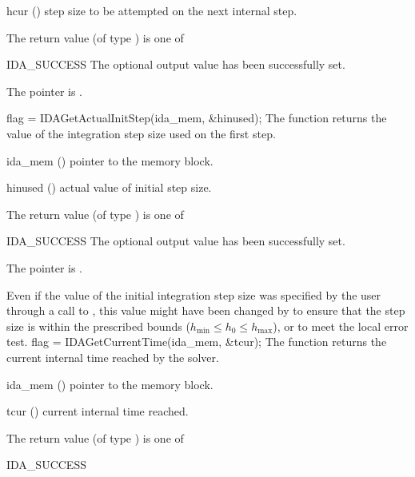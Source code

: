 {{\begin{args}
  \item[hcur] ()
    step size to be attempted on the next internal step.
  \end{args}
}
{
  The return value  (of type ) is one of
  \begin{args}
  \item[IDA\_SUCCESS]
    The optional output value has been successfully set.
  \item[\Id{IDA\_MEM\_NULL}]
    The  pointer is .
  \end{args}
}
{}
{
  flag = IDAGetActualInitStep(ida\_mem, \&hinused);
}
{
  The function  returns the
  value of the integration step size used on the first step.
}
{
  \begin{args}
  \item[ida\_mem] ()
    pointer to the {\idas} memory block.
  \item[hinused] ()
    actual value of initial step size.
  \end{args}
}
{
  The return value  (of type ) is one of
  \begin{args}
  \item[IDA\_SUCCESS]
    The optional output value has been successfully set.
  \item[\Id{IDA\_MEM\_NULL}]
    The  pointer is .
  \end{args}
}
{
  Even if the value of the initial integration step size was specified
  by the user through a call to , this value might have
  been changed by {\idas} to ensure that the step size is within the
  prescribed bounds ($h_{\min} \le h_0 \le h_{\max}$), or to meet the
  local error test.
}
{
  flag = IDAGetCurrentTime(ida\_mem, \&tcur);
}
{
  The function  returns the
  current internal time reached by the solver.
}
{
  \begin{args}
  \item[ida\_mem] ()
    pointer to the {\idas} memory block.
  \item[tcur] ()
    current internal time reached.
  \end{args}
}
{
  The return value  (of type ) is one of
  \begin{args}
  \item[IDA\_SUCCESS]

\end{args}}}
